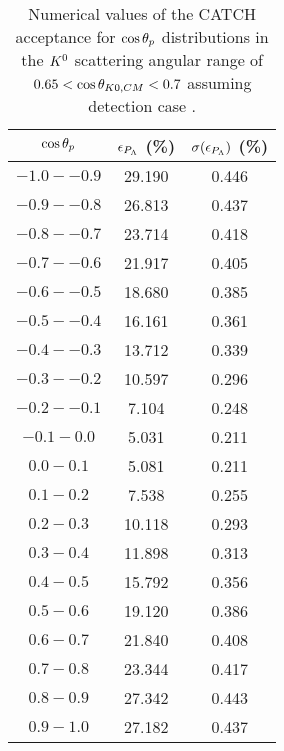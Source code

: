 \begin{table}[!h] 
  \begin{center}
  \caption{Numerical values of the CATCH acceptance for $\cos{\theta_p}$ distributions in the $K^{0}$ scattering angular range of \textbf{$0.65<\cos{\theta_{K0,CM}}<0.7$} assuming detection case .}
  \centering
  \begin{threeparttable}
    \begin{tabular}{ccc}
    $\cos{\theta_p}$ & $\epsilon_{P_{\Lambda}}$ (\%) & $\sigma(\epsilon_{P_{\Lambda}})$ (\%) \\
    \midrule\midrule
    $-1.0 - -0.9$ & 29.190 & 0.446 \\
    \midrule
    $-0.9 - -0.8$ & 26.813 & 0.437 \\
    \midrule
    $-0.8 - -0.7$ & 23.714 & 0.418 \\
    \midrule
    $-0.7 - -0.6$ & 21.917 & 0.405 \\
    \midrule
    $-0.6 - -0.5$ & 18.680 & 0.385 \\
    \midrule
    $-0.5 - -0.4$ & 16.161 & 0.361 \\
    \midrule
    $-0.4 - -0.3$ & 13.712 & 0.339 \\
    \midrule
    $-0.3 - -0.2$ & 10.597 & 0.296 \\
    \midrule
    $-0.2 - -0.1$ & 7.104 & 0.248 \\
    \midrule
    $-0.1 - 0.0$ & 5.031 & 0.211 \\
    \midrule
    $0.0 - 0.1$ & 5.081 & 0.211 \\
    \midrule
    $0.1 - 0.2$ & 7.538 & 0.255 \\
    \midrule
    $0.2 - 0.3$ & 10.118 & 0.293 \\
    \midrule
    $0.3 - 0.4$ & 11.898 & 0.313 \\
    \midrule
    $0.4 - 0.5$ & 15.792 & 0.356 \\
    \midrule
    $0.5 - 0.6$ & 19.120 & 0.386 \\
    \midrule
    $0.6 - 0.7$ & 21.840 & 0.408 \\
    \midrule
    $0.7 - 0.8$ & 23.344 & 0.417 \\
    \midrule
    $0.8 - 0.9$ & 27.342 & 0.443 \\
    \midrule
    $0.9 - 1.0$ & 27.182 & 0.437 \\
    \end{tabular}
  \end{threeparttable}
  \label{tab-Pl-acc_33}
  \end{center}
\end{table}

